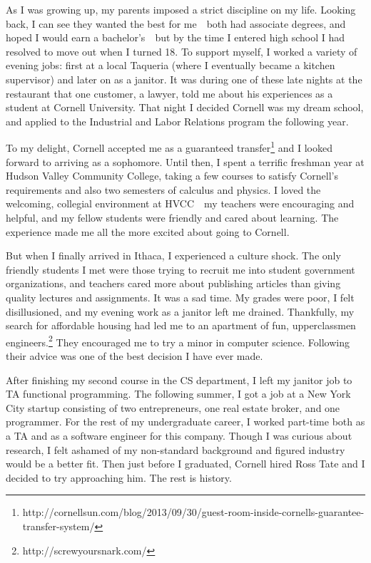 \documentclass[12pt]{article}
\begin{document}
As I was growing up, my parents imposed a strict discipline on my life.
Looking back, I can see they wanted the best for me~\textemdash~both had associate degrees, and hoped I would earn a bachelor's~\textemdash~but by the time I entered high school I had resolved to move out when I turned 18.
To support myself, I worked a variety of evening jobs: first at a local Taqueria (where I eventually became a kitchen supervisor) and later on as a janitor.
It was during one of these late nights at the restaurant that one customer, a lawyer, told me about his experiences as a student at Cornell University.
That night I decided Cornell was my dream school, and applied to the Industrial and Labor Relations program the following year.

To my delight, Cornell accepted me as a guaranteed transfer\footnote{http://cornellsun.com/blog/2013/09/30/guest-room-inside-cornells-guarantee-transfer-system/} and I looked forward to arriving as a sophomore.
Until then, I spent a terrific freshman year at Hudson Valley Community College, taking a few courses to satisfy Cornell's requirements and also two semesters of calculus and physics.
I loved the welcoming, collegial environment at HVCC~\textemdash~my teachers were encouraging and helpful, and my fellow students were friendly and cared about learning.
The experience made me all the more excited about going to Cornell.

But when I finally arrived in Ithaca, I experienced a culture shock.
The only friendly students I met were those trying to recruit me into student government organizations, and teachers cared more about publishing articles than giving quality lectures and assignments.
It was a sad time.
My grades were poor, I felt disillusioned, and my evening work as a janitor left me drained.
Thankfully, my search for affordable housing had led me to an apartment of fun, upperclassmen engineers.\footnote{http://screwyoursnark.com/}
They encouraged me to try a minor in computer science.
Following their advice was one of the best decision I have ever made.

After finishing my second course in the CS department, I left my janitor job to TA functional programming.
The following summer, I got a job at a New York City startup consisting of two entrepreneurs, one real estate broker, and one programmer.
For the rest of my undergraduate career, I worked part-time both as a TA and as a software engineer for this company.
Though I was curious about research, I felt ashamed of my non-standard background and figured industry would be a better fit.
Then just before I graduated, Cornell hired Ross Tate and I decided to try approaching him.
The rest is history.
\end{document}

